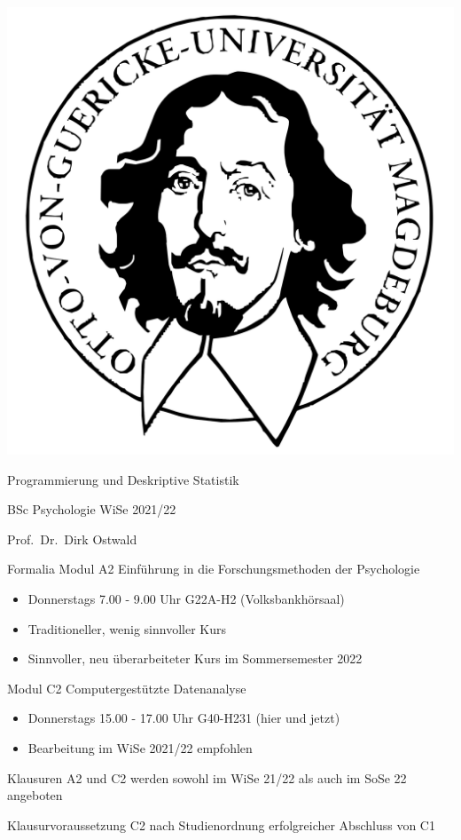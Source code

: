 \documentclass[
  8pt,
  ignorenonframetext,
]{beamer}
\author{}
\date{\vspace{-2.5em}}
\providecommand{\tightlist}{%
  \setlength{\itemsep}{0pt}\setlength{\parskip}{0pt}}
\begin{document}
\begin{frame}[plain]{}
\protect\hypertarget{section}{}
\center

\begin{center}\includegraphics[width=0.2\linewidth]{2_Abbildungen/pds_2_otto} \end{center}

\vspace{2mm}

\huge

Programmierung und Deskriptive Statistik \vspace{6mm}

\large

BSc Psychologie WiSe 2021/22

\vspace{6mm}
\large

Prof.~Dr.~Dirk Ostwald
\end{frame}

\begin{frame}{Formalia}
\protect\hypertarget{formalia}{}
Modul A2 Einführung in die Forschungsmethoden der Psychologie

\begin{itemize}
\tightlist
\item
  Donnerstags 7.00 - 9.00 Uhr G22A-H2 (Volksbankhörsaal)
\item
  Traditioneller, wenig sinnvoller Kurs
\item
  Sinnvoller, neu überarbeiteter Kurs im Sommersemester 2022
\end{itemize}

Modul C2 Computergestützte Datenanalyse

\begin{itemize}
\tightlist
\item
  Donnerstags 15.00 - 17.00 Uhr G40-H231 (hier und jetzt)
\item
  Bearbeitung im WiSe 2021/22 empfohlen
\end{itemize}

Klausuren A2 und C2 werden sowohl im WiSe 21/22 als auch im SoSe 22
angeboten

Klausurvoraussetzung C2 nach Studienordnung erfolgreicher Abschluss von
C1
\end{frame}
\end{document}
